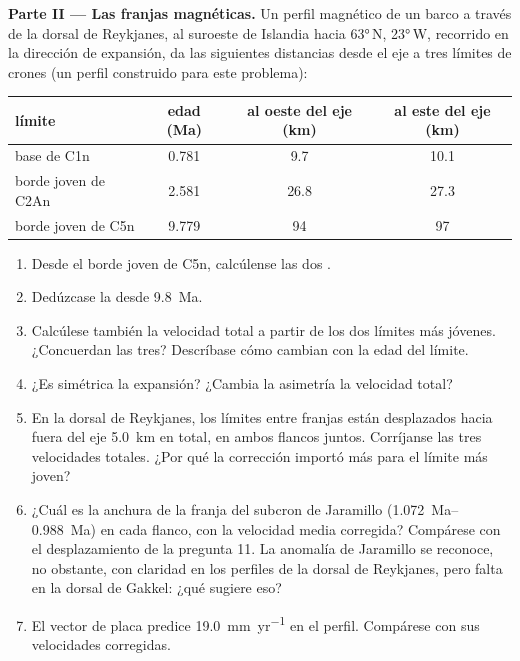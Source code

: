 \begin{problem}
\noindent\textbf{Parte II --- Las franjas magnéticas.}
Un perfil magnético de un barco a través de la dorsal de Reykjanes, al suroeste de Islandia hacia \ang{63}\,N, \ang{23}\,W, recorrido en la
dirección de expansión, da las siguientes distancias desde el eje a tres límites de crones (un perfil construido para este problema):
\begin{center}\small
\begin{tabular}{lccc}
\hline
límite & edad (Ma) & al oeste del eje (km) & al este del eje (km)\\
\hline
base de C1n & 0.781 & 9.7 & 10.1\\
borde joven de C2An & 2.581 & 26.8 & 27.3\\
borde joven de C5n & 9.779 & 94 & 97\\
\hline
\end{tabular}
\end{center}
\begin{enumerate}[resume]
  \item Desde el borde joven de C5n, calcúlense las dos .
  \item Dedúzcase la  desde \qty{9.8}{Ma}.
  \item Calcúlese también la velocidad total a partir de los dos límites más jóvenes. ¿Concuerdan las tres? Descríbase cómo cambian con
        la edad del límite.
  \item ¿Es simétrica la expansión? ¿Cambia la asimetría la velocidad total?
  \item En la dorsal de Reykjanes, los límites entre franjas están desplazados hacia fuera del eje \qty{5.0}{km} en total, en ambos
        flancos juntos. Corríjanse las tres velocidades totales. ¿Por qué la corrección importó más para el límite más joven?
  \item ¿Cuál es la anchura de la franja del subcron de Jaramillo (\qtyrange{1.072}{0.988}{Ma}) en cada flanco, con la velocidad media
        corregida? Compárese con el desplazamiento de la pregunta 11. La anomalía de Jaramillo se reconoce, no obstante, con claridad en
        los perfiles de la dorsal de Reykjanes, pero falta en la dorsal de Gakkel: ¿qué sugiere eso?
  \item El vector de placa predice \qty{19.0}{mm.yr^{-1}} en el perfil. Compárese con sus velocidades corregidas.
\end{enumerate}


\end{problem}
